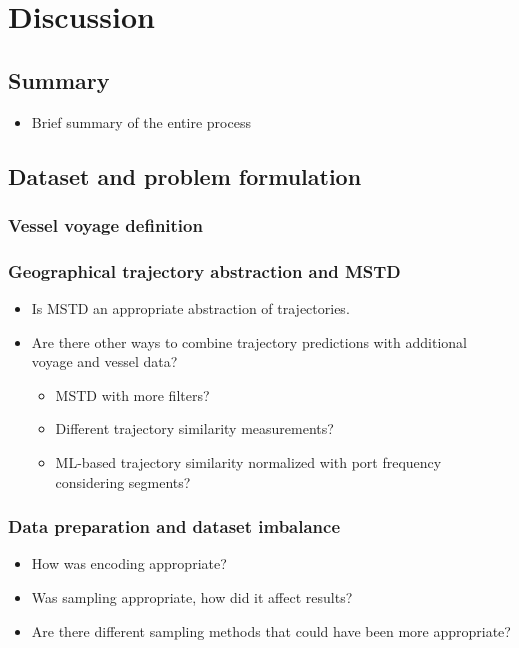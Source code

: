 \chapter{Discussion}

\section{Summary}

\begin{itemize}
    \item Brief summary of the entire process
\end{itemize}

\section{Dataset and problem formulation}

\subsection{Vessel voyage definition}

\subsection{Geographical trajectory abstraction and MSTD}
\begin{itemize}
    \item Is MSTD an appropriate abstraction of trajectories.
    \item Are there other ways to combine trajectory predictions with additional voyage and vessel data?
    \begin{itemize}
        \item MSTD with more filters?
        \item Different trajectory similarity measurements?
        \item ML-based trajectory similarity normalized with port frequency considering segments?
    \end{itemize}
\end{itemize}

\subsection{Data preparation and dataset imbalance}
\begin{itemize}
    \item How was encoding appropriate?
    \item Was sampling appropriate, how did it affect results?
    \item Are there different sampling methods that could have been more appropriate?
\end{itemize}

